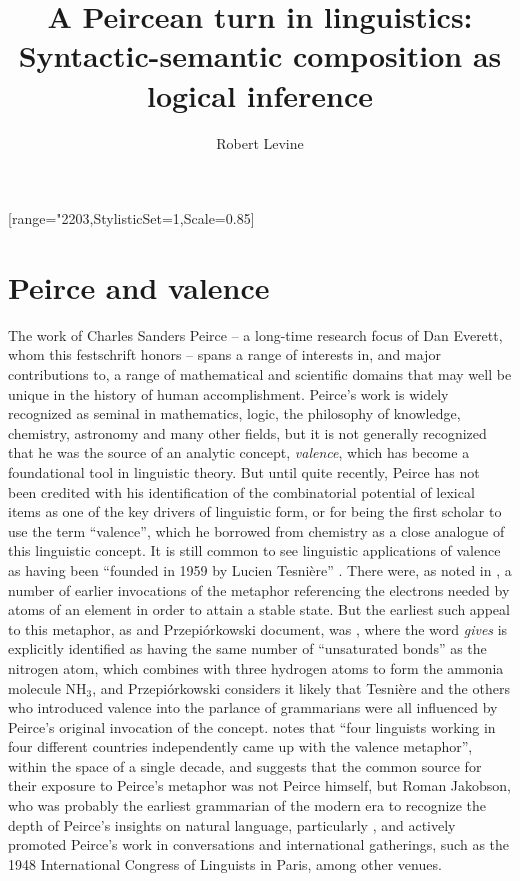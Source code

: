 \documentclass[output=paper,colorlinks,citecolor=brown]{langscibook}
\title{A Peircean turn in linguistics: Syntactic-semantic composition as logical inference}
\author{Robert Levine\affiliation{Ohio State University}}
\begin{document}
[range={"2203},StylisticSet=1,Scale=0.85]
\maketitle
\providecommand{\SetInfLen}{\relax}


\section{Peirce and valence}

The work of Charles Sanders Peirce -- a long-time research focus of Dan
Everett, whom this festschrift honors -- spans a range of interests in,
and major contributions to, a range of mathematical and scientific
domains that may well be unique in the history of human
accomplishment. Peirce's work is widely recognized as seminal in
mathematics, logic, the philosophy of knowledge, chemistry, astronomy
and many other fields, but it is not generally recognized that he was
the source of an analytic concept, \emph{valence}, which has become
a foundational tool in linguistic theory. But until quite recently,
Peirce has not been credited with his identification of the
combinatorial potential of lexical items as one of the key drivers of
linguistic form, or for being the first scholar to use the term
``valence'', which he borrowed from chemistry as a close analogue of
this linguistic concept. It is still common to see linguistic
applications of valence as having been ``founded in 1959 by Lucien
Tesnière'' \citep{hollein2022}. There were, as noted in \citet{AdamP-Peirce}, a
number of earlier invocations of the metaphor referencing the
electrons needed by atoms of an element in order to attain a stable
state. But the earliest such appeal to this metaphor, as \citet{askedal91}
and Przepi\'{o}rkowski document, was \citet{peirce1897}, where the word
\textit{gives} is explicitly identified as having the same number of
``unsaturated bonds'' as the nitrogen atom, which combines with three
hydrogen atoms to form the ammonia molecule NH$_3$, and
Przepi{\'o}rkowski considers it likely that Tesnière and the
others who introduced valence into the parlance of grammarians were
all influenced by Peirce's original invocation of the
concept. \citet[155]{AdamP-Peirce} notes that ``four linguists working
in four different countries independently came up with the valence
metaphor'', within the space of a single decade, and suggests that the
common source for their exposure to Peirce's metaphor was not Peirce
himself, but Roman Jakobson, who was probably the earliest
grammarian of the modern era to recognize the depth of Peirce's
insights on natural language, particularly \citet{peirce1897}, and actively
promoted Peirce's work in conversations and international gatherings,
such as the 1948 International Congress of Linguists in Paris, among
other venues.
\end{document}
